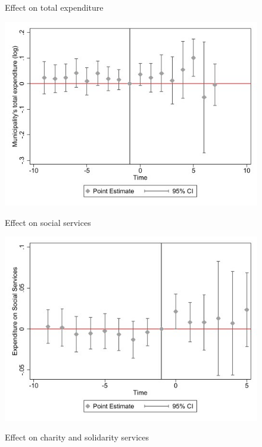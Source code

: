 \documentclass[authoryear,preprint,review,12pt]{elsarticle}
\begin{document}
\begin{figure}[H]
\begin{minipage}[t]{.5\linewidth}
   \centering
    \caption{Effect on total expenditure}
    \includegraphics[scale = 0.5]{images/total event dd.jpg}
    \label{fig1}
\end{minipage}\hfill
\begin{minipage}[t]{.5\linewidth}
    \centering
    \caption{Effect on social services}
    \includegraphics[scale = 0.5]{images/social event dd.jpg}
    \label{fig2}
\end{minipage}
    \centering
    \caption{Effect on charity and solidarity services}

\end{figure}
\end{document}
